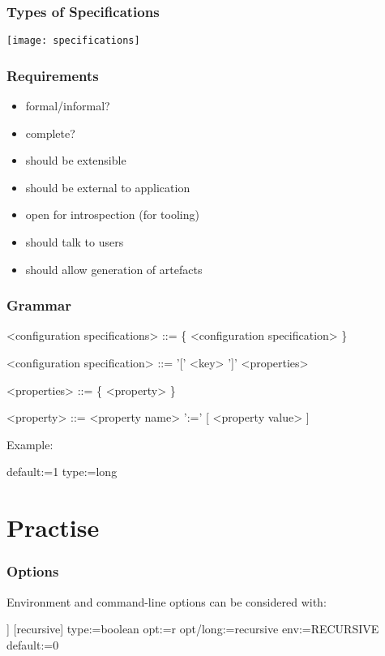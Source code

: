 \begin{frame}
	\frametitle{Types of Specifications}
	\texttt{[image: specifications]}
\end{frame}


\begin{frame}
	\frametitle{Requirements}

	\begin{itemize}
	\item formal/informal?
	\item complete?
	\pause
	\item should be extensible
	\item should be external to application
	\item open for introspection (for tooling)
	\item should talk to users
	\item should allow generation of artefacts
	\end{itemize}
\end{frame}


\begin{frame}[fragile]
	\frametitle{Grammar}
	\begin{grammar}
	<configuration specifications> ::= \{ <configuration specification> \}

	<configuration specification> ::= '[' <key> ']' <properties>

	<properties> ::= \{ <property> \}

	<property> ::= <property name> ':=' [ <property value> ]
	\end{grammar}

	\vspace{1cm}
	Example:
	\begin{code}
	default:=1
	type:=long
	\end{code}
\end{frame}


\section{Practise}

\begin{frame}[fragile]
	\frametitle{Options}

	Environment and command-line options can be considered with:

	\begin{code}[morekeywords={long,env},gobble=4]]
	[recursive]
	  type:=boolean
	  opt:=r
	  opt/long:=recursive
	  env:=RECURSIVE
	  default:=0
	\end{code}
\end{frame}

